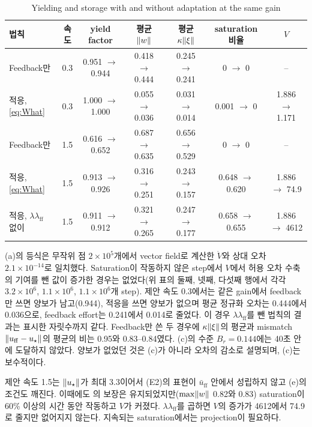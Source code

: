 \documentclass[11pt]{article}\usepackage[margin=1in]{geometry}\usepackage{amsmath,amssymb,amsthm,mathtools}\usepackage{graphicx}\graphicspath{{figures/}{../figures/}{figs/}{./}}\usepackage{enumitem}\usepackage{hyperref}\usepackage{cleveref}\usepackage{tikz}\usetikzlibrary{arrows.meta,positioning,calc,shapes.geometric}\usepackage{float}\usepackage[most]{tcolorbox}\usepackage{kotex}\usepackage{booktabs}\emergencystretch=1.6em\tolerance=2000 \crefname{assumption}{Assumption}{Assumptions}\Crefname{assumption}{Assumption}{Assumptions}\crefname{definition}{Definition}{Definitions}\Crefname{definition}{Definition}{Definitions}\crefname{proposition}{Proposition}{Propositions}\Crefname{proposition}{Proposition}{Propositions}\crefname{fact}{Fact}{Facts}\Crefname{fact}{Fact}{Facts} \newtheorem{assumption}{Assumption}\newtheorem{definition}{Definition}\newtheorem{lemma}{Lemma}\newtheorem{proposition}{Proposition}\newtheorem{theorem}{Theorem}\newtheorem{corollary}{Corollary}\newtheorem{fact}{Fact}\theoremstyle{remark}\newtheorem{remark}{Remark} \newcommand{\R}{\mathbb{R}}\newcommand{\U}{\mathcal U}
\begin{document}
\begin{table}[H]
\centering\footnotesize\setlength{\tabcolsep}{3pt}
\caption{Yielding and storage with and without adaptation at the same gain}
\label{tab:adapt}
\begin{tabular}{p{2.7cm}cccccc}
\toprule
법칙 & 속도 & yield factor & 평균 $\lVert w\rVert$ & 평균 $\kappa\lVert \xi\rVert$ & saturation 비율 & $V$ \\
\midrule
Feedback만 & 0.3 & 0.951 $\to$ 0.944 & 0.418 $\to$ 0.444 & 0.245 $\to$ 0.241 & 0 $\to$ 0 & -- \\
적응, \eqref{eq:What} & 0.3 & 1.000 $\to$ 1.000 & 0.055 $\to$ 0.036 & 0.031 $\to$ 0.014 & 0.001 $\to$ 0 & 1.886 $\to$ 1.171 \\
Feedback만 & 1.5 & 0.616 $\to$ 0.652 & 0.687 $\to$ 0.635 & 0.656 $\to$ 0.529 & 0 $\to$ 0 & -- \\
적응, \eqref{eq:What} & 1.5 & 0.913 $\to$ 0.926 & 0.316 $\to$ 0.251 & 0.243 $\to$ 0.157 & 0.648 $\to$ 0.620 & 1.886 $\to$ 74.9 \\
적응, $\lambda\lambda_{\mathrm{ff}}$ 없이 & 1.5 & 0.911 $\to$ 0.912 & 0.321 $\to$ 0.265 & 0.247 $\to$ 0.177 & 0.658 $\to$ 0.655 & 1.886 $\to$ 4612 \\
\bottomrule
\end{tabular}
\end{table}

(a)의 등식은 무작위 점 $2\times10^5$개에서 vector field로 계산한 $\dot V$와 상대 오차 $2.1\times10^{-14}$로 일치했다. Saturation이 작동하지 않은 step에서 $V$에서 허용 오차 수축의 기여를 뺀 값이 증가한 경우는 없었다(위 표의 둘째, 넷째, 다섯째 행에서 각각 $3.2\times10^6$, $1.1\times10^6$, $1.1\times10^6$개 step). 제안 속도 0.3에서는 같은 gain에서 feedback만 쓰면 양보가 남고(0.944), 적응을 쓰면 양보가 없으며 평균 정규화 오차는 0.444에서 0.036으로, feedback effort는 0.241에서 0.014로 줄었다. 이 경우 $\lambda\lambda_{\mathrm{ff}}$를 뺀 법칙의 결과는 표시한 자릿수까지 같다. Feedback만 쓴 두 경우에 $\kappa\lVert \xi\rVert$의 평균과 mismatch $\lVert u_{\mathrm{ff}}-u_\star\rVert$의 평균의 비는 0.95와 0.83--0.84였다. (c)의 수준 $B_r=0.144$에는 40초 안에 도달하지 않았다. 양보가 없었던 것은 (c)가 아니라 오차의 감소로 설명되며, (c)는 보수적이다.

제안 속도 1.5는 $\lVert u_\star\rVert$가 최대 3.3이어서 (E2)의 표현이 $\bar u_{\mathrm{ff}}$ 안에서 성립하지 않고 (e)의 조건도 깨진다. 이때에도 의 보장은 유지되었지만($\max\lVert w\rVert$ 0.82와 0.83) saturation이 60\% 이상의 시간 동안 작동하고 $V$가 커졌다. $\lambda\lambda_{\mathrm{ff}}$를 곱하면 $V$의 증가가 4612에서 74.9로 줄지만 없어지지 않는다. 지속되는 saturation에서는 projection이 필요하다.
\end{document}
